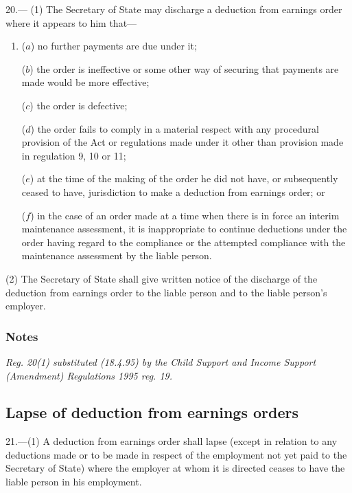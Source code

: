 \documentclass[a4paper]{article}
\newcommand\amendment[1]{\subsubsection*{Notes}{\itshape\frenchspacing\footnotesize #1 \par}}
\begin{document}
20.—%
%
%
(1) The Secretary of State may discharge a deduction from earnings order where it appears to him that—
\begin{enumerate}\item[]
($a$) no further payments are due under it;

($b$) the order is ineffective or some other way of securing that payments are made would be more effective;

($c$) the order is defective;

($d$) the order fails to comply in a material respect with any procedural provision of the Act or regulations made under it other than provision made in regulation 9, 10 or 11;

($e$) at the time of the making of the order he did not have, or subsequently ceased to have, jurisdiction to make a deduction from earnings order; or

($f$) in the case of an order made at a time when there is in force an interim maintenance assessment, it is inappropriate to continue deductions under the order having regard to the compliance or the attempted compliance with the maintenance assessment by the liable person.
\end{enumerate}


(2) The Secretary of State shall give written notice of the discharge of the deduction from earnings order to the liable person and to the liable person’s employer.

\amendment{
Reg. 20(1) substituted (18.4.95) by the Child Support and Income Support (Amendment) Regulations 1995 reg. 19.
}

\subsection[21. Lapse of deduction from earnings orders]{Lapse of deduction from earnings orders}

21.—(1) A deduction from earnings order shall lapse (except in relation to any deductions made or to be made in respect of the employment not yet paid to the Secretary of State) where the employer at whom it is directed ceases to have the liable person in his employment.
\end{document}
